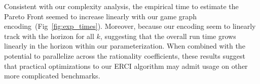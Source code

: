 
 Consistent with our complexity analysis, the
empirical time to estimate the Pareto Front seemed to increase linearly
with our game graph encoding~(Fig~\ref{fig:exp_times}). Moreover,
because our encoding seem to linearly track with the horizon for all
$k$, suggesting that the overall run time grows linearly in the horizon
within our parameterization. When combined with the potential to
parallelize across the rationality coefficients, these results suggest
that practical optimizations to our ERCI algorithm may admit usage on
other more complicated benchmarks.





